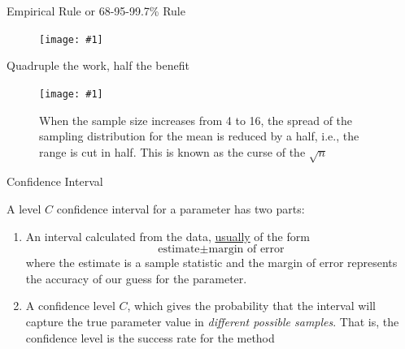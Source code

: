 \documentclass{beamer}\usepackage[]{graphicx}\usepackage[]{color}
\newcommand {\framedgraphiccaption}[2] {
	\begin{figure}
		\centering
		\texttt{[image: \#1]}
		\caption{#2}
	\end{figure}
}
\newcommand {\framedgraphic}[1] {
	\begin{figure}
		\centering
		\texttt{[image: \#1]}
	\end{figure}
}
\begin{document}
\begin{frame}[fragile]{Empirical Rule or 68-95-99.7\% Rule}

\framedgraphic{../sampling_dist/6899rule.png}

\end{frame}



\begin{frame}[fragile]{Quadruple the work, half the benefit}

\framedgraphiccaption{../sampling_dist/ROOToceanAll.png}{When the sample size increases from 4 to 16, the spread of the sampling distribution for the mean is reduced by a half, i.e., the range is cut in half. This is known as the curse of the $\sqrt{n}$}
\end{frame}


\begin{frame}{Confidence Interval}

\begin{defm}
	A level $C$ confidence interval for a parameter has two parts:
	\begin{enumerate}
		\item An interval calculated from the data, \underline{usually} of the form $$\textrm{estimate} \pm \textrm{margin of error}$$ where the estimate is a sample statistic and the margin of error represents the accuracy of our guess for the parameter.
		\item A confidence level $C$, which gives the probability that the interval will capture the true parameter value in \textit{different possible samples}. That is, the confidence level is the success rate for the method
	\end{enumerate}
\end{defm}


\end{frame}

\end{document}
